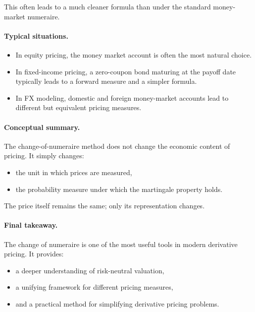 \documentclass[11pt]{article}
\theoremstyle{definition}
\theoremstyle{plain}
\begin{document}
This often leads to a much cleaner formula than under the standard
money-market numeraire.

\paragraph{Typical situations.}
\begin{itemize}[leftmargin=1.4em]
\item In equity pricing, the money market account is often the most
natural choice.
\item In fixed-income pricing, a zero-coupon bond maturing at the payoff
date typically leads to a forward measure and a simpler formula.
\item In FX modeling, domestic and foreign money-market accounts lead to
different but equivalent pricing measures.
\end{itemize}

\paragraph{Conceptual summary.}
The change-of-numeraire method does not change the economic content of
pricing.
It simply changes:
\begin{itemize}[leftmargin=1.4em]
\item the unit in which prices are measured,
\item the probability measure under which the martingale property holds.
\end{itemize}

The price itself remains the same; only its representation changes.

\paragraph{Final takeaway.}
The change of numeraire is one of the most useful tools in modern
derivative pricing.
It provides:
\begin{itemize}[leftmargin=1.4em]
\item a deeper understanding of risk-neutral valuation,
\item a unifying framework for different pricing measures,
\item and a practical method for simplifying derivative pricing
problems.
\end{itemize}
\end{document}

